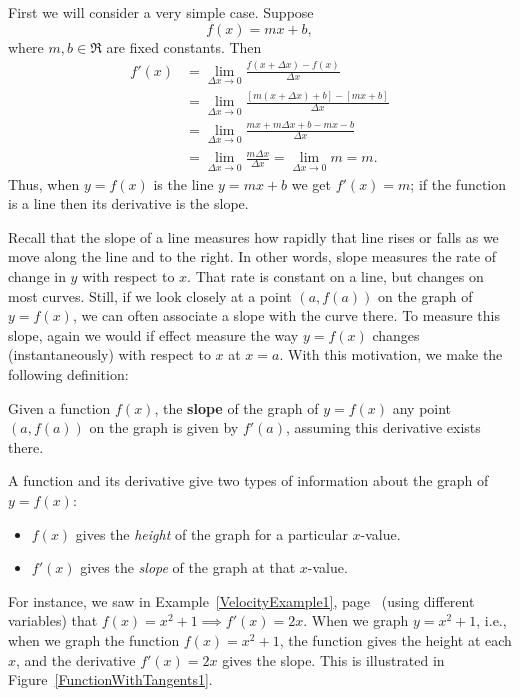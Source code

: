 First we will consider a very simple case.  Suppose
$$f(x)=mx+b,$$
where $m,b\in\Re$ are fixed constants.  Then
\begin{align*}f'(x)&=\lim_{\Delta x\to0}
\frac{f(x+\Delta x)-f(x)}{\Delta x}\\
&=\lim_{\Delta x\to0}\frac{[m(x+\Delta x)+b]-[mx+b]}{\Delta x}\\
&=\lim_{\Delta x\to0}\frac{mx+m\Delta x+b-mx-b}{\Delta x}\\
&=\lim_{\Delta x\to0}\frac{m\Delta x}{\Delta x}
=\lim_{\Delta x\to0}m=m.
\end{align*}
Thus, when $y=f(x)$ is the line $y=mx+b$ we get $f'(x)=m$;
if the function is a line then its derivative is the slope.

Recall that the slope of a line measures how rapidly
that line rises or falls as we move along the line and to the right.
In other words, slope measures the rate of change
in $y$ with respect to $x$.  That rate is constant on
a line, but changes on most curves.  Still, if we
look closely at a point $(a,f(a))$ on the graph
of $y=f(x)$,
we can often associate a slope with the curve there.\footnotemark
{}\hphantom{. }To measure this slope, again we would
if effect measure the way $y=f(x)$ changes (instantaneously)
with respect to $x$ at $x=a$.  
With this motivation, we make the following definition:

\begin{definition}Given a function $f(x)$, the {\bf slope}
of the graph of $y=f(x)$ any point $(a,f(a))$ on the graph
is given by $f'(a)$, assuming this derivative exists there.\footnotemark
{}
\end{definition}


A function and its derivative give two types of information
about the graph of $y=f(x)$:
\begin{itemize}
\item $f(x)$ gives the {\it height} of the graph for a particular $x$-value.
\item $f'(x)$ gives the {\it slope} of the graph at that $x$-value.
\end{itemize}  
For instance, we saw in Example~\ref{VelocityExample1}, 
page~\pageref{VelocityExample1}
(using different variables) that 
 $f(x)=x^2+1\implies f'(x)=2x$.
When we graph $y=x^2+1$, i.e., when we graph the function
$f(x)=x^2+1$, the function gives the height at each $x$,
and the derivative $f'(x)=2x$ gives the slope.
This is illustrated in Figure~\ref{FunctionWithTangents1}.

